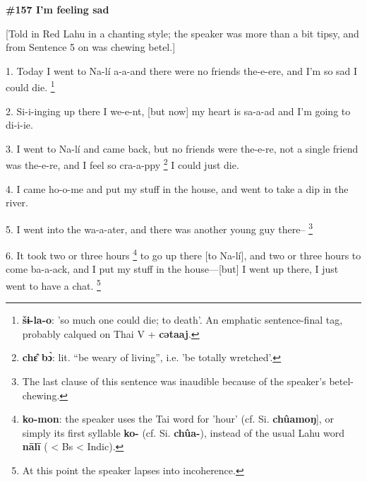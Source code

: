 
\textbf{\#157 I'm feeling sad}

[Told in Red Lahu in a chanting style; the speaker was more than a bit tipsy, and
from Sentence 5 on was chewing betel.]

1. Today I went to Na-lí a-a-and there were no friends the-e-ere, and I'm so sad
I could die. \footnote{\textbf{šɨ-la-o}: 'so much one could die; to death'. An emphatic sentence-final tag, probably calqued on Thai V + \textbf{cətaaj}.}

2. Si-i-inging up there I we-e-nt, [but now] my heart is sa-a-ad and I'm going
to di-i-ie.

3. I went to Na-lí and came back, but no friends were the-e-re, not a single friend
was the-e-re, and I feel so cra-a-ppy \footnote{\textbf{chɛ̂ bɔ̀}: lit. ``be weary of living'', i.e. 'be totally wretched'.} I could just die.

4. I came ho-o-me and put my stuff in the house, and went to take a dip in the
river.

5. I went into the wa-a-ater, and there was another young guy there-- \footnote{The last clause of this sentence was inaudible because of the speaker's betel-chewing.}

6. It took two or three hours \footnote{\textbf{ko-mon}: the speaker uses the Tai word for 'hour' (cf. Si. \textbf{chûamoŋ}], or simply its first syllable \textbf{ko-} (cf. Si. \textbf{chûa-}), instead of the usual Lahu word \textbf{nālī} ( < Bs < Indic).} to go up there [to Na-lí], and two or three
hours to come ba-a-ack, and I put my stuff in the house---[but] I went up there,
I just went to have a chat. \footnote{At this point the speaker lapses into incoherence.}

